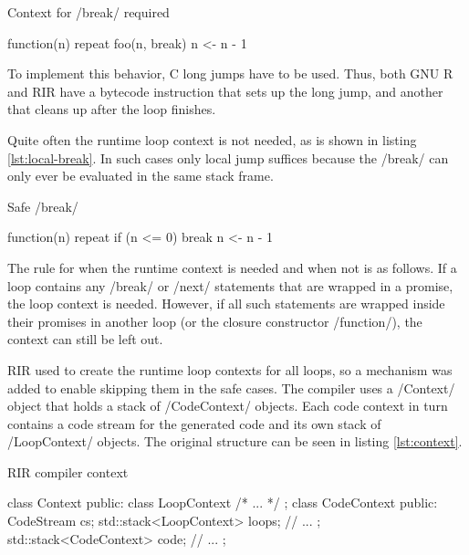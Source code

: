 \begin{listing}[htbp]
  \caption{\label{lst:non-local-break}Context for \rinline/break/ required}
  \begin{rcode}
function(n) {
    repeat {
        foo(n, break)
        n <- n - 1
    }
}
  \end{rcode}
\end{listing}

To implement this behavior, C long jumps have to be used. Thus, both GNU R and RIR have a bytecode instruction that sets up the long jump, and another that cleans up after the loop finishes.

Quite often the runtime loop context is not needed, as is shown in listing \ref{lst:local-break}. In such cases only local jump suffices because the \rinline/break/ can only ever be evaluated in the same stack frame.

\begin{listing}[htbp]
  \caption{\label{lst:local-break}Safe \rinline/break/}
  \begin{rcode}
function(n) {
    repeat {
        if (n <= 0) break
        n <- n - 1
    }
}
  \end{rcode}
\end{listing}

The rule for when the runtime context is needed and when not is as follows. If a loop contains any \rinline/break/ or \rinline/next/ statements that are wrapped in a promise, the loop context is needed. However, if all such statements are wrapped inside their promises in another loop (or the closure constructor \rinline/function/), the context can still be left out.

RIR used to create the runtime loop contexts for all loops, so a mechanism was added to enable skipping them in the safe cases. The compiler uses a \cppinline/Context/ object that holds a stack of \cppinline/CodeContext/ objects. Each code context in turn contains a code stream for the generated code and its own stack of \cppinline/LoopContext/ objects. The original structure can be seen in listing \ref{lst:context}.

\begin{listing}[htbp]
  \caption{\label{lst:context}RIR compiler context}
  \begin{cppcode}
class Context {
  public:
    class LoopContext { /* ... */ };
    class CodeContext {
      public:
        CodeStream cs;
        std::stack<LoopContext> loops;
        // ...
    };
    std::stack<CodeContext> code;
    // ...
};
  \end{cppcode}
\end{listing}

